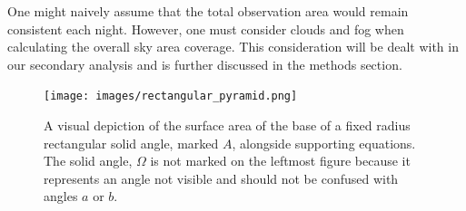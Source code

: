 One might naively assume that the total observation area would remain consistent each night.
However, one must consider clouds and fog when calculating the overall sky area coverage.
This consideration will be dealt with in our secondary analysis and is further discussed in the methods section.


\begin{figure}[ht!]
  \centering
  \texttt{[image: images/rectangular\_pyramid.png]}
  \caption[A visual depiction of the surface area of the base of a fixed radius rectangular solid angle, marked $A$, alongside supporting equations.]{A visual depiction of the surface area of the base of a fixed radius rectangular solid angle, marked $A$, alongside supporting equations.  The solid angle, $\Omega$ is not marked on the leftmost figure because it represents an angle not visible and should not be confused with angles $a$ or $b$.}
  \label{useful_area_equation}
\end{figure}


